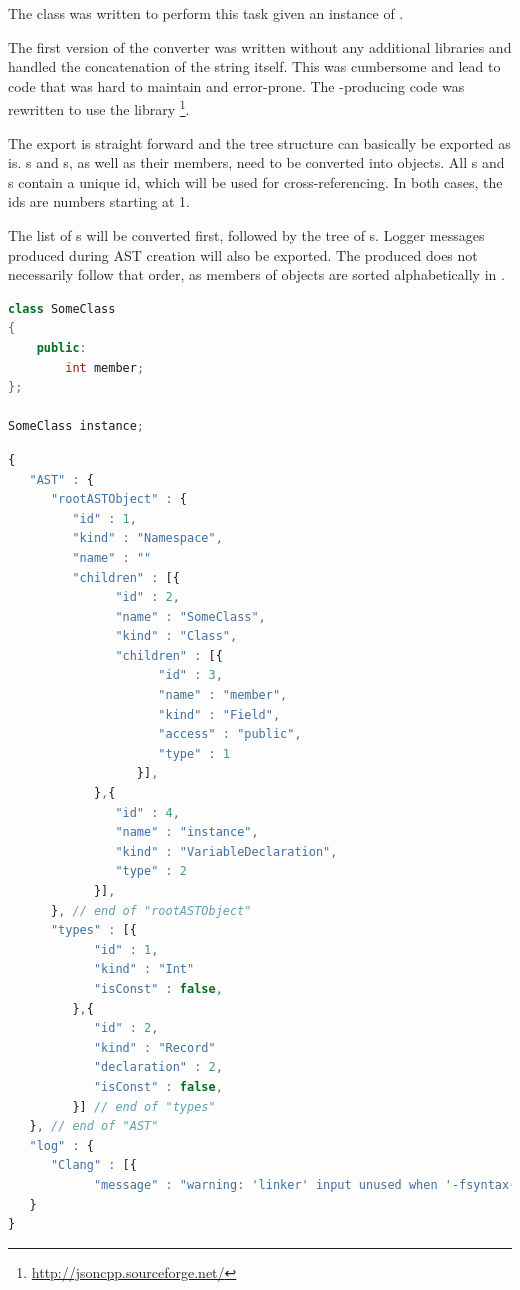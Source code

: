 The class  was written to perform this task given an instance of \linebreak{}.

The first version of the converter was written without any additional libraries and handled the concatenation of the  string itself. This was cumbersome and lead to code that was hard to maintain and error-prone. The -producing code was rewritten to use the library \footnote{\url{http://jsoncpp.sourceforge.net/}}.

The export is straight forward and the tree structure can basically be exported as is. s and s, as well as their members, need to be converted into  objects. All s and s contain a unique id, which will be used for cross-referencing. In both cases, the ids are numbers starting at 1.

The list of s will be converted first, followed by the tree of s. Logger messages produced during AST creation will also be exported. The produced  does not necessarily follow that order, as members of  objects are sorted alphabetically in .

\SingleSpacing
\begin{lstlisting}[language=C++, caption=Example AST for \myProperName{JSON} conversion]
class SomeClass
{
	public:
		int member;
};

SomeClass instance;
\end{lstlisting}
\OnehalfSpacing

\SingleSpacing
\begin{lstlisting}[language=JavaScript, caption=AST converted to \myProperName{JSON} (reduced example), label=listing:JSON]
{
   "AST" : {
      "rootASTObject" : {
         "id" : 1,
         "kind" : "Namespace",
         "name" : ""
         "children" : [{
               "id" : 2,
               "name" : "SomeClass",
               "kind" : "Class",
               "children" : [{
                     "id" : 3,
                     "name" : "member",
                     "kind" : "Field",
                     "access" : "public",
                     "type" : 1
                  }],
            },{
               "id" : 4,
               "name" : "instance",
               "kind" : "VariableDeclaration",
               "type" : 2
            }],
      }, // end of "rootASTObject"
      "types" : [{
            "id" : 1,
            "kind" : "Int"
            "isConst" : false,
         },{
            "id" : 2,
            "kind" : "Record"		 
            "declaration" : 2,
            "isConst" : false,
         }] // end of "types"
   }, // end of "AST"
   "log" : {
      "Clang" : [{
            "message" : "warning: 'linker' input unused when '-fsyntax-only' is present", "type" : "Warning" }]
   }
}
\end{lstlisting}
\OnehalfSpacing

